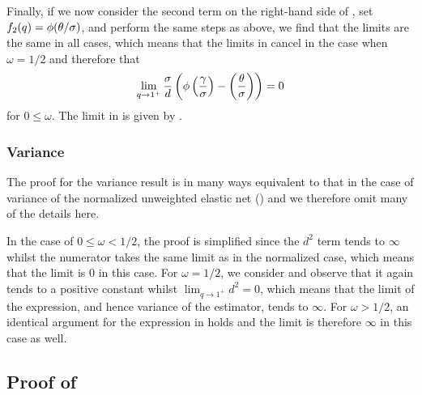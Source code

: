 Finally, if we now consider the second term on the right-hand side of
, set \(f_2(q) = \operatorname{\phi}(\theta/\sigma)\), and perform the
same steps as above, we find that the limits are the same in all cases, which means that
the limits in  cancel in the case when \(\omega = 1/2\)
and therefore that
\[
  \lim_{q \rightarrow 1^+} \frac{\sigma}{d} \left(\operatorname{\phi}\left(\frac{\gamma}{\sigma}\right) - \left(\frac{\theta}{\sigma}\right)\right) = 0
\]
for \(0 \leq \omega \). The limit in  is given by
.

\subsubsection{Variance}

The proof for the variance result is in many ways equivalent to that in the case of
variance of the normalized unweighted elastic net ()
and we therefore omit many of the details here.

In the case of \(0 \leq \omega < 1/2\), the proof is simplified since the \(d^2\) term
tends to \(\infty\) whilst the numerator takes the same limit as in the normalized case,
which means that the limit is \(0\) in this case. For \(\omega = 1/2\), we consider
 and observe that it again tends to a positive constant
whilst \(\lim_{q\rightarrow 1^+} d^2 = 0\), which means that the limit of the expression,
and hence variance of the estimator, tends to \(\infty\). For \(\omega > 1/2\), an
identical argument for the expression in  holds and the
limit is therefore \(\infty\) in this case as well.

\subsection{Proof of }


